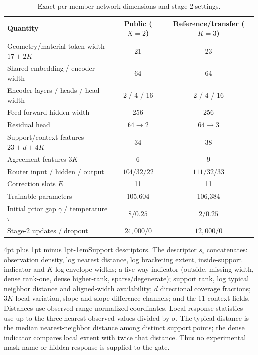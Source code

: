\documentclass{article}
\makeatletter
\renewcommand{\paragraph}{\@startsection{paragraph}{4}{\z@}
  {4pt plus 1pt minus 1pt}{-1em}{\normalsize\bf}}
\makeatother
\begin{document}
\begin{table}[ht]
\centering\small
\caption{Exact per-member network dimensions and stage-2 settings.}
\label{tab:network-spec}
\begin{tabular}{@{}lcc@{}}
\toprule
Quantity & Public ($K=2$) & Reference/transfer ($K=3$) \\
\midrule
Geometry/material token width $17+2K$ & 21 & 23 \\
Shared embedding / encoder width & 64 & 64 \\
Encoder layers / heads / head width & 2 / 4 / 16 & 2 / 4 / 16 \\
Feed-forward hidden width & 256 & 256 \\
Residual head & $64\rightarrow2$ & $64\rightarrow3$ \\
Support/context features $23+d+4K$ & 34 & 38 \\
Agreement features $3K$ & 6 & 9 \\
Router input / hidden / output & $104/32/22$ & $111/32/33$ \\
Correction slots $E$ & 11 & 11 \\
Trainable parameters & 105,604 & 106,384 \\
Initial prior gap $\gamma$ / temperature $\tau$ & $8/0.25$ & $2/0.25$ \\
Stage-2 updates / dropout & $24{,}000/0$ & $12{,}000/0$ \\
\bottomrule
\end{tabular}
\end{table}

\paragraph{Support descriptors.}
The descriptor $s_i$ concatenates: observation density, log nearest distance,
log bracketing extent, inside-support indicator and $K$ log envelope widths;
a five-way indicator (outside, missing width, dense rank-one, dense higher-rank,
sparse/degenerate); support rank, log typical neighbor distance and aligned-width
availability; $d$ directional coverage fractions; $3K$ local variation, slope
and slope-difference channels; and the 11 context fields. Distances use
observed-range-normalized coordinates. Local response statistics use up to the
three nearest observed values divided by $\sigma$. The typical distance is the
median nearest-neighbor distance among distinct support points; the dense
indicator compares local extent with twice that distance. Thus no experimental
mask name or hidden response is supplied to the gate.
\end{document}
